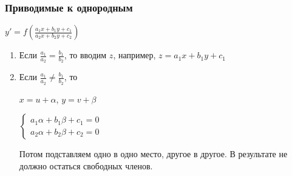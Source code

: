 \documentclass{article}
\begin{document}
\subsubsection{Приводимые к однородным}

$y' = f (\frac{a_1 x + b_1 y + c_1}{a_2 x + b_2 y + c_2})$

\begin{enumerate}
    \item Если $\frac{a_1}{a_2} = \frac{b_1}{b_2}$, то вводим $z$, например, $z = a_1 x + b_1 y + c_1$
    \item Если $\frac{a_1}{a_2} \ne \frac{b_1}{b_2}$, то
    
    $x = u + \alpha$, $y = v + \beta$

    $\begin{cases}
        a_1 \alpha + b_1 \beta + c_1 = 0 \\
        a_2 \alpha + b_2 \beta + c_2 = 0
    \end{cases}$

    Потом подставляем одно в одно место, другое в другое. В результате не должно остаться свободных членов.
\end{enumerate}
\end{document}

